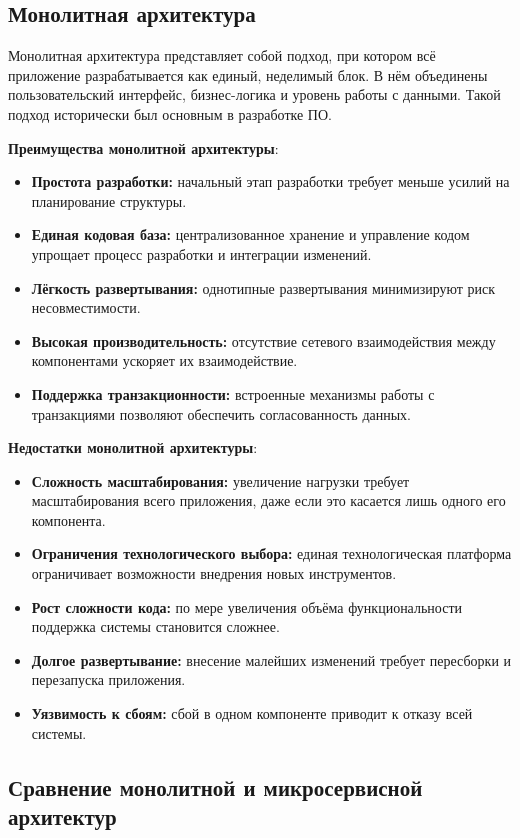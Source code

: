 \subsection{Монолитная архитектура}

Монолитная архитектура представляет собой подход, при котором всё приложение разрабатывается как единый, неделимый блок. В нём объединены пользовательский интерфейс, бизнес-логика и уровень работы с данными. Такой подход исторически был основным в разработке ПО.

\textbf{Преимущества монолитной архитектуры}:
\begin{itemize}
    \item \textbf{Простота разработки:} начальный этап разработки требует меньше усилий на планирование структуры.
    \item \textbf{Единая кодовая база:} централизованное хранение и управление кодом упрощает процесс разработки и интеграции изменений.
    \item \textbf{Лёгкость развертывания:} однотипные развертывания минимизируют риск несовместимости.
    \item \textbf{Высокая производительность:} отсутствие сетевого взаимодействия между компонентами ускоряет их взаимодействие.
    \item \textbf{Поддержка транзакционности:} встроенные механизмы работы с транзакциями позволяют обеспечить согласованность данных.
\end{itemize}

\textbf{Недостатки монолитной архитектуры}:
\begin{itemize}
    \item \textbf{Сложность масштабирования:} увеличение нагрузки требует масштабирования всего приложения, даже если это касается лишь одного его компонента.
    \item \textbf{Ограничения технологического выбора:} единая технологическая платформа ограничивает возможности внедрения новых инструментов.
    \item \textbf{Рост сложности кода:} по мере увеличения объёма функциональности поддержка системы становится сложнее.
    \item \textbf{Долгое развертывание:} внесение малейших изменений требует пересборки и перезапуска приложения.
    \item \textbf{Уязвимость к сбоям:} сбой в одном компоненте приводит к отказу всей системы.
\end{itemize}


\subsection{Сравнение монолитной и микросервисной архитектур}


